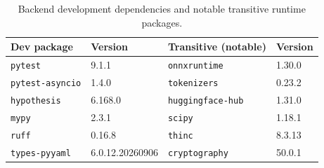 \documentclass[11pt,a4paper]{article}
\begin{document}
\begin{table}[h]
\centering\small
\caption{Backend development dependencies and notable transitive runtime packages.}
\begin{tabular}{@{}llll@{}}
\toprule
\textbf{Dev package} & \textbf{Version} & \textbf{Transitive (notable)} & \textbf{Version}\\
\midrule
\texttt{pytest}        & 9.1.1  & \texttt{onnxruntime} & 1.30.0\\
\texttt{pytest-asyncio}& 1.4.0  & \texttt{tokenizers}  & 0.23.2\\
\texttt{hypothesis}    & 6.168.0& \texttt{huggingface-hub} & 1.31.0\\
\texttt{mypy}          & 2.3.1  & \texttt{scipy}       & 1.18.1\\
\texttt{ruff}          & 0.16.8 & \texttt{thinc}       & 8.3.13\\
\texttt{types-pyyaml}  & 6.0.12.20260906 & \texttt{cryptography} & 50.0.1\\
\bottomrule
\end{tabular}
\end{table}
\end{document}
